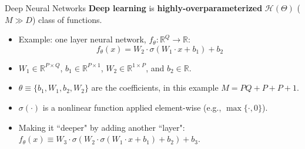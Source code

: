 \documentclass[aspectratio=169,10pt]{beamer}
\newcommand{\emphcolor}[1]{\textbf{\textcolor{emphcolorval}{#1}}}
\begin{document}
\begin{frame}{Deep Neural Networks}
	\emphcolor{Deep learning} is \emphcolor{highly-overparameterized} $\mathcal{H}(\Theta)$ ($M\gg D$) class of functions.
	\begin{itemize}
		
		\item Example: one layer neural network, $f_{\theta} : \mathbb{R}^Q\rightarrow \mathbb{R}$:
		\begin{equation*}
			f_{\theta}(x) = W_2 \cdot \sigma \left(W_1\cdot x+b_1\right)+b_2
		\end{equation*}
		\vspace{0.1in}
		\item $W_1\in \mathbb{R}^{P\times Q}$, $b_1\in \mathbb{R}^{P\times 1}$, $W_2 \in \mathbb{R}^{1\times P}$, and $b_2 \in \mathbb{R}$.
		\vspace{0.1in} 
		\item $\theta \equiv \{b_1,W_1,b_2,W_2\}$ are the coefficients, in this example $M = PQ+P+P+1$.
		\vspace{0.1in} 
		\item $\sigma(\cdot)$ is a nonlinear function applied element-wise (e.g., $\max\{\cdot,0\}$).
		\vspace{0.1in}
		\item Making it ``deeper" by adding another ``layer":
		$f_{\theta}(x)\equiv W_3\cdot\sigma(W_2 \cdot \sigma(W_1 \cdot x + b_1) + b_2)+b_3.$
	\end{itemize}	
\end{frame}
\end{document}

